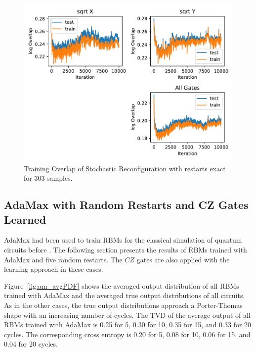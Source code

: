 \begin{figure}[H]
  \centering
  \includegraphics[width=\textwidth]{figures/results/SR-restarts-not-learned/avgOverlap_303.pdf}
  \caption[Training overlap of Stochastic Reconfiguration with restarts exact]{Training 
  Overlap of Stochastic Reconfiguration with restarts exact for 303 samples.}
  \label{fig:sr_exact_overlap_303}
\end{figure}

\newpage

\subsection{AdaMax with Random Restarts and CZ Gates Learned}

AdaMax had been used to train RBMs for the 
classical simulation of quantum circuits before \cite{jnsson2018neuralnetwork}. The following section presents the results
of RBMs trained with AdaMax and five random restarts. The $CZ$ gates are also applied with the 
learning approach in these cases.

Figure~\ref{fig:am_avgPDF} shows the averaged output distribution of all RBMs trained with AdaMax and 
the averaged true output distributions of all circuits. As in the other cases, the 
true output distributions approach a Porter-Thomas shape with an increasing number of cycles.
The TVD of the average output of all RBMs trained with AdaMax
is 0.25 for 5, 0.30 for 10, 0.35 for 15, and 0.33 for 20 cycles. The corresponding cross entropy is 
0.20 for 5, 0.08 for 10, 0.06 for 15, and 0.04 for 20 cycles.

